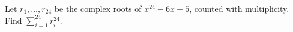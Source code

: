 Let $r_1,\ldots,r_{24}$ be the complex roots of $x^{24}-6x+5$, counted with multiplicity. Find $\sum_{i=1}^{24}r_i^{24}$.
